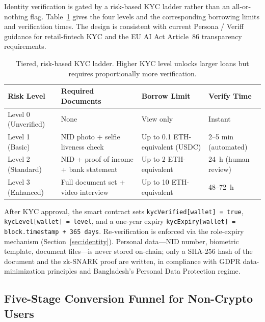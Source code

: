 \documentclass[12pt,a4paper]{report}
\begin{document}
\label{sec:tiered-kyc}

Identity verification is gated by a risk-based KYC ladder rather than an all-or-nothing flag. Table~\ref{tab:tiered-kyc} gives the four levels and the corresponding borrowing limits and verification times. The design is consistent with current Persona / Veriff guidance for retail-fintech KYC and the EU AI Act Article~86 transparency requirements.

\begin{table}[H]
\centering
\caption{Tiered, risk-based KYC ladder. Higher KYC level unlocks larger loans but requires proportionally more verification.}
\label{tab:tiered-kyc}
\begin{tabular}{p{2.2cm}p{5.8cm}p{2.8cm}p{2.6cm}}
\hline
\textbf{Risk Level} & \textbf{Required Documents} & \textbf{Borrow Limit} & \textbf{Verify Time} \\
\hline
Level 0 (Unverified) & None & View only & Instant \\
\hline
Level 1 (Basic) & NID photo + selfie liveness check & Up to 0.1 ETH-equivalent (USDC) & 2--5 min (automated) \\
\hline
Level 2 (Standard) & NID + proof of income + bank statement & Up to 2 ETH-equivalent & 24~h (human review) \\
\hline
Level 3 (Enhanced) & Full document set + video interview & Up to 10 ETH-equivalent & 48--72~h \\
\hline
\end{tabular}
\end{table}

After KYC approval, the smart contract sets \texttt{kycVerified[wallet] = true}, \texttt{kycLevel[wallet] = level}, and a one-year expiry \texttt{kycExpiry[wallet] = block.timestamp + 365 days}. Re-verification is enforced via the role-expiry mechanism (Section~\ref{sec:identity}). Personal data---NID number, biometric template, document files---is never stored on-chain; only a SHA-256 hash of the document and the zk-SNARK proof are written, in compliance with GDPR data-minimization principles and Bangladesh's Personal Data Protection regime.

\subsection{Five-Stage Conversion Funnel for Non-Crypto Users}
\label{sec:funnel}
\end{document}
